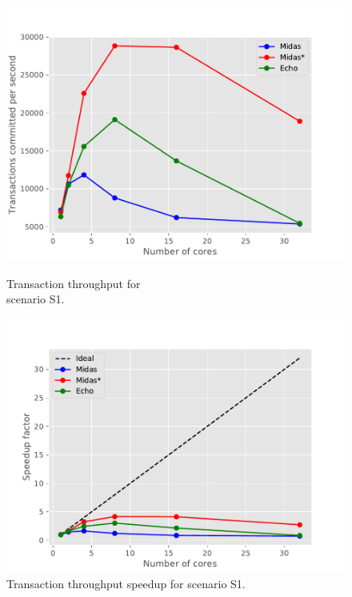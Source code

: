\begin{figure}[h!]
\begin{minipage}[l]{0.50\textwidth}
    \includegraphics[width=\textwidth]{figures/bench/ttp-ss}
    \caption{Transaction throughput for\\scenario S1.}
    \label{fig:ttp-s1}
\end{minipage}
\begin{minipage}[l]{0.50\textwidth}
    \includegraphics[width=\textwidth]{figures/bench/spd-ss}
    \caption{Transaction throughput speedup for scenario S1.}
    \label{fig:spd-s1}
\end{minipage}
\begin{minipage}[l]{0.50\textwidth}

\end{minipage}
\end{figure}
